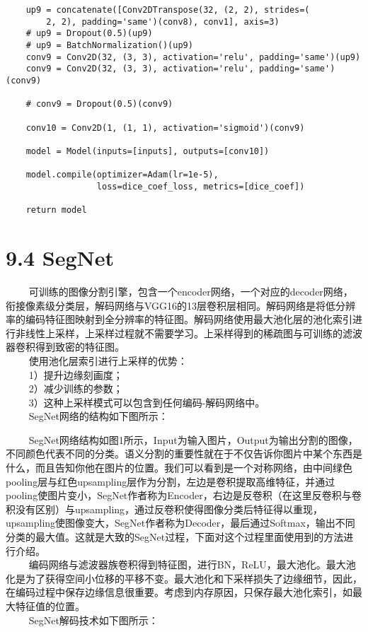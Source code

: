 \begin{verbatim}
    up9 = concatenate([Conv2DTranspose(32, (2, 2), strides=(
        2, 2), padding='same')(conv8), conv1], axis=3)
    # up9 = Dropout(0.5)(up9)
    # up9 = BatchNormalization()(up9)
    conv9 = Conv2D(32, (3, 3), activation='relu', padding='same')(up9)
    conv9 = Conv2D(32, (3, 3), activation='relu', padding='same')(conv9)

    # conv9 = Dropout(0.5)(conv9)

    conv10 = Conv2D(1, (1, 1), activation='sigmoid')(conv9)

    model = Model(inputs=[inputs], outputs=[conv10])

    model.compile(optimizer=Adam(lr=1e-5),
                  loss=dice_coef_loss, metrics=[dice_coef])

    return model
\end{verbatim}

\section{9.4 SegNet}\label{segnet}

  
可训练的图像分割引擎，包含一个encoder网络，一个对应的decoder网络，衔接像素级分类层，解码网络与VGG16的13层卷积层相同。解码网络是将低分辨率的编码特征图映射到全分辨率的特征图。解码网络使用最大池化层的池化索引进行非线性上采样，上采样过程就不需要学习。上采样得到的稀疏图与可训练的滤波器卷积得到致密的特征图。\\
   使用池化层索引进行上采样的优势：\\
   1）提升边缘刻画度；\\
   2）减少训练的参数；\\
   3）这种上采样模式可以包含到任何编码-解码网络中。\\
   SegNet网络的结构如下图所示：

\begin{figure}
\centering
\end{figure}

  
SegNet网络结构如图1所示，Input为输入图片，Output为输出分割的图像，不同颜色代表不同的分类。语义分割的重要性就在于不仅告诉你图片中某个东西是什么，而且告知你他在图片的位置。我们可以看到是一个对称网络，由中间绿色pooling层与红色upsampling层作为分割，左边是卷积提取高维特征，并通过pooling使图片变小，SegNet作者称为Encoder，右边是反卷积（在这里反卷积与卷积没有区别）与upsampling，通过反卷积使得图像分类后特征得以重现，upsampling使图像变大，SegNet作者称为Decoder，最后通过Softmax，输出不同分类的最大值。这就是大致的SegNet过程，下面对这个过程里面使用到的方法进行介绍。\\
  
编码网络与滤波器族卷积得到特征图，进行BN，ReLU，最大池化。最大池化是为了获得空间小位移的平移不变。最大池化和下采样损失了边缘细节，因此，在编码过程中保存边缘信息很重要。考虑到内存原因，只保存最大池化索引，如最大特征值的位置。\\
   SegNet解码技术如下图所示：


